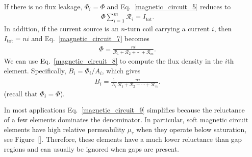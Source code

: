 \documentclass[12pt,a4paper,oneside]{book}
\begin{document}
\begin{onehalfspace}
If there is no flux leakage, $\Phi_i=\Phi$ and Eq.~\eqref{magnetic_circuit_5} reduces to
\begin{equation}\label{magnetic_circuit_7}
	{\begin{aligned}
		\Phi\sum_{i=1}^{m}\mathscr{R}_i=I_\text{tot}.
	\end{aligned}}
\end{equation} 
In addition, if the current source is an $n$-turn coil carrying a current $i$, then $I_\text{tot}=ni$ and Eq.~\eqref{magnetic_circuit_7} becomes
\begin{equation}\label{magnetic_circuit_8}
	{\begin{aligned}
			\Phi=\frac{ni}{\mathscr{R}_1+\mathscr{R}_2+\cdots+\mathscr{R}_m}.
	\end{aligned}}
\end{equation} 
We can use Eq.~\eqref{magnetic_circuit_8} to compute the flux density in the $i$th element. Specifically, $B_i=\Phi_i/A_i$, which gives
\begin{equation}\label{magnetic_circuit_9}
	{\begin{aligned}
		B_i=\frac{1}{A_i}\frac{ni}{\mathscr{R}_1+\mathscr{R}_2+\cdots+\mathscr{R}_m}.
	\end{aligned}}
\end{equation} 
(recall that $\Phi_i=\Phi$).

In most applications Eq.~\eqref{magnetic_circuit_9} simplifies because the reluctance of a few elements dominates the denominator. In particular, soft magnetic circuit elements have high relative permeability $\mu_r$ when they operate below saturation, see Figure~\ref{}. Therefore, these elements have a much lower reluctance than gap regions and can usually be ignored when gaps are present.


\end{onehalfspace}
\end{document}
